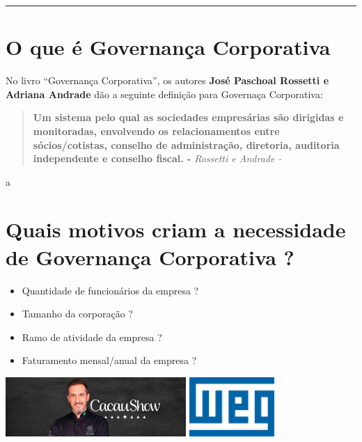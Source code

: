 \documentclass[
]{book}
\providecommand{\tightlist}{%
  \setlength{\itemsep}{0pt}\setlength{\parskip}{0pt}}
\begin{document}
\begin{center}\rule{0.5\linewidth}{0.5pt}\end{center}

\section{O que é Governança Corporativa}\label{o-que-uxe9-governanuxe7a-corporativa}

No livro ``Governança Corporativa'', os autores \textbf{José Paschoal Rossetti e Adriana Andrade} dão a seguinte definição para Governaça Corporativa:

\begin{quote}
\textbf{Um sistema pelo qual as sociedades empresárias são dirigidas e monitoradas, envolvendo os relacionamentos entre sócios/cotistas, conselho de administração, diretoria, auditoria independente e conselho fiscal. -} \emph{Rossetti e Andrade -}
\end{quote}

a

\section{Quais motivos criam a necessidade de Governança Corporativa ?}\label{quais-motivos-criam-a-necessidade-de-governanuxe7a-corporativa}

\begin{itemize}
\tightlist
\item
  Quantidade de funcionários da empresa ?
\item
  Tamanho da corporação ?
\item
  Ramo de atividade da empresa ?
\item
  Faturamento mensal/anual da empresa ?
\end{itemize}

\includegraphics[width=2.69792in,height=\textheight]{images/02-2025-08-12_13/01-Ale_costa_Cacau_Show.jpg} \textbar{} \includegraphics[width=1.27083in,height=\textheight]{images/02-2025-08-12_13/02-Weg.jpg}
\end{document}
